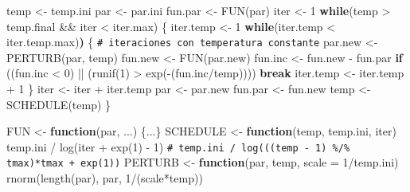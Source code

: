 \documentclass[
  10pt,
]{book}
\newenvironment{Shaded}{\begin{snugshade}}{\end{snugshade}}
\newcommand{\AttributeTok}[1]{\textcolor[rgb]{0.77,0.63,0.00}{#1}}
\newcommand{\CommentTok}[1]{\textcolor[rgb]{0.56,0.35,0.01}{\textit{#1}}}
\newcommand{\ControlFlowTok}[1]{\textcolor[rgb]{0.13,0.29,0.53}{\textbf{#1}}}
\newcommand{\DecValTok}[1]{\textcolor[rgb]{0.00,0.00,0.81}{#1}}
\newcommand{\ErrorTok}[1]{\textcolor[rgb]{0.64,0.00,0.00}{\textbf{#1}}}
\newcommand{\FunctionTok}[1]{\textcolor[rgb]{0.00,0.00,0.00}{#1}}
\newcommand{\NormalTok}[1]{#1}
\newcommand{\OtherTok}[1]{\textcolor[rgb]{0.56,0.35,0.01}{#1}}
\newcommand{\SpecialCharTok}[1]{\textcolor[rgb]{0.00,0.00,0.00}{#1}}
\theoremstyle{break}
\theoremstyle{nonumberplain}
\renewcommand{\CommentTok}[1]{\textcolor[rgb]{0.41,0.41,0.41}{\texttt{#1}}}
\begin{document}
\begin{Shaded}
\begin{Highlighting}[]
\NormalTok{temp }\OtherTok{\textless{}{-}}\NormalTok{ temp.ini}
\NormalTok{par }\OtherTok{\textless{}{-}}\NormalTok{ par.ini}
\NormalTok{fun.par }\OtherTok{\textless{}{-}} \FunctionTok{FUN}\NormalTok{(par)}
\NormalTok{iter }\OtherTok{\textless{}{-}} \DecValTok{1}
\ControlFlowTok{while}\NormalTok{(temp }\SpecialCharTok{\textgreater{}}\NormalTok{ temp.final }\SpecialCharTok{\&\&}\NormalTok{ iter }\SpecialCharTok{\textless{}}\NormalTok{ iter.max) \{}
\NormalTok{  iter.temp }\OtherTok{\textless{}{-}} \DecValTok{1}
  \ControlFlowTok{while}\NormalTok{(iter.temp }\SpecialCharTok{\textless{}}\NormalTok{ iter.temp.max)}\ErrorTok{)}\NormalTok{ \{ }\CommentTok{\# iteraciones con temperatura constante}
\NormalTok{    par.new }\OtherTok{\textless{}{-}} \FunctionTok{PERTURB}\NormalTok{(par, temp)}
\NormalTok{    fun.new }\OtherTok{\textless{}{-}} \FunctionTok{FUN}\NormalTok{(par.new)}
\NormalTok{    fun.inc }\OtherTok{\textless{}{-}}\NormalTok{ fun.new }\SpecialCharTok{{-}}\NormalTok{ fun.par}
    \ControlFlowTok{if}\NormalTok{ ((fun.inc }\SpecialCharTok{\textless{}} \DecValTok{0}\NormalTok{) }\SpecialCharTok{||}\NormalTok{ (}\FunctionTok{runif}\NormalTok{(}\DecValTok{1}\NormalTok{) }\SpecialCharTok{\textgreater{}} \FunctionTok{exp}\NormalTok{(}\SpecialCharTok{{-}}\NormalTok{(fun.inc}\SpecialCharTok{/}\NormalTok{temp)))) }\ControlFlowTok{break}
\NormalTok{    iter.temp }\OtherTok{\textless{}{-}}\NormalTok{ iter.temp }\SpecialCharTok{+} \DecValTok{1}
\NormalTok{  \}}
\NormalTok{  iter }\OtherTok{\textless{}{-}}\NormalTok{ iter }\SpecialCharTok{+}\NormalTok{ iter.temp}
\NormalTok{  par }\OtherTok{\textless{}{-}}\NormalTok{ par.new}
\NormalTok{  fun.par }\OtherTok{\textless{}{-}}\NormalTok{ fun.new}
\NormalTok{  temp }\OtherTok{\textless{}{-}} \FunctionTok{SCHEDULE}\NormalTok{(temp)}
\NormalTok{\}}

\NormalTok{FUN }\OtherTok{\textless{}{-}} \ControlFlowTok{function}\NormalTok{(par, ...) \{...\}}
\NormalTok{SCHEDULE }\OtherTok{\textless{}{-}} \ControlFlowTok{function}\NormalTok{(temp, temp.ini, iter) }
\NormalTok{  temp.ini }\SpecialCharTok{/} \FunctionTok{log}\NormalTok{(iter }\SpecialCharTok{+} \FunctionTok{exp}\NormalTok{(}\DecValTok{1}\NormalTok{) }\SpecialCharTok{{-}} \DecValTok{1}\NormalTok{)}
  \CommentTok{\# temp.ini / log(((temp {-} 1) \%/\% tmax)*tmax + exp(1))}
\NormalTok{PERTURB }\OtherTok{\textless{}{-}} \ControlFlowTok{function}\NormalTok{(par, temp, }\AttributeTok{scale =} \DecValTok{1}\SpecialCharTok{/}\NormalTok{temp.ini) }
  \FunctionTok{rnorm}\NormalTok{(}\FunctionTok{length}\NormalTok{(par), par, }\DecValTok{1}\SpecialCharTok{/}\NormalTok{(scale}\SpecialCharTok{*}\NormalTok{temp))}
\end{Highlighting}
\end{Shaded}
\end{document}
